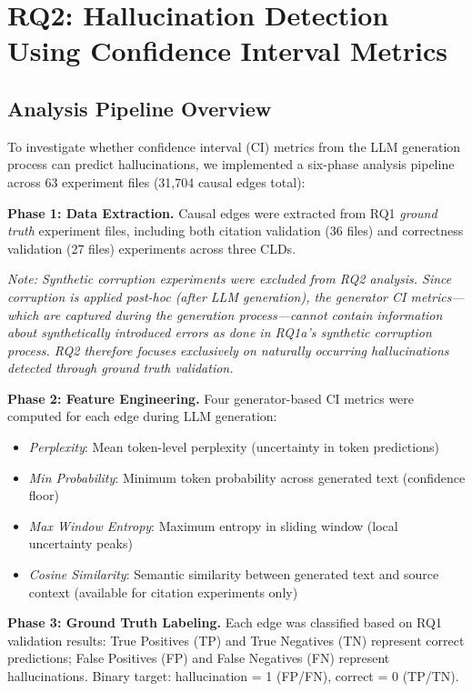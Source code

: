 \documentclass{article}
\begin{document}
\section{RQ2: Hallucination Detection Using Confidence Interval Metrics}

\subsection{Analysis Pipeline Overview}

To investigate whether confidence interval (CI) metrics from the LLM generation process can predict hallucinations, we implemented a six-phase analysis pipeline across 63 experiment files (31,704 causal edges total):

\textbf{Phase 1: Data Extraction.} Causal edges were extracted from RQ1 \textit{ground truth} experiment files, including both citation validation (36 files) and correctness validation (27 files) experiments across three CLDs. 

\textit{Note: Synthetic corruption experiments were excluded from RQ2 analysis. Since corruption is applied post-hoc (after LLM generation), the generator CI metrics---which are captured during the generation process---cannot contain information about synthetically introduced errors as done in RQ1a's synthetic corruption process. RQ2 therefore focuses exclusively on naturally occurring hallucinations detected through ground truth validation.}

\textbf{Phase 2: Feature Engineering.} Four generator-based CI metrics were computed for each edge during LLM generation:
\begin{itemize}
    \item \textit{Perplexity}: Mean token-level perplexity (uncertainty in token predictions)
    \item \textit{Min Probability}: Minimum token probability across generated text (confidence floor)
    \item \textit{Max Window Entropy}: Maximum entropy in sliding window (local uncertainty peaks)
    \item \textit{Cosine Similarity}: Semantic similarity between generated text and source context (available for citation experiments only)
\end{itemize}

\textbf{Phase 3: Ground Truth Labeling.} Each edge was classified based on RQ1 validation results: True Positives (TP) and True Negatives (TN) represent correct predictions; False Positives (FP) and False Negatives (FN) represent hallucinations. Binary target: hallucination = 1 (FP/FN), correct = 0 (TP/TN).
\end{document}
